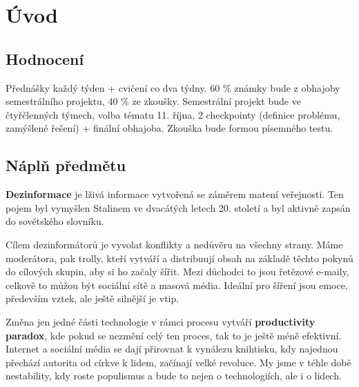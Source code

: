 \section*{Úvod}

\vspace{12pt}

\subsection*{Hodnocení}

Přednášky každý týden + cvičení co dva týdny. 60 \% známky bude z obhajoby semestrálního projektu, 40 \% ze zkoušky. Semestrální projekt bude ve čtyřčlenných týmech, volba tématu 11. října, 2 checkpointy (definice problému, zamýšlené řešení) + finální obhajoba. Zkouška bude formou písemného testu.

\subsection*{Náplň předmětu}

\textbf{Dezinformace} je lživá informace vytvořená se záměrem matení veřejnosti. Ten pojem byl vymyšlen Stalinem ve dvacátých letech 20. století a byl aktivně zapsán do sovětského slovníku.

\begin{quote}
\end{quote}

Cílem dezinformátorů je vyvolat konflikty a nedůvěru na všechny strany. Máme moderátora, pak trolly, kteří vytváří a distribuují obsah na základě těchto pokynů do cílových skupin, aby si ho začaly šířit. Mezi důchodci to jsou řetězové e-maily, celkově to můžou být sociální sítě a masová média. Ideální pro šíření jsou emoce, především vztek, ale ještě silnější je vtip.

\begin{quote}
\end{quote}

Změna jen jedné části technologie v rámci procesu vytváří \textbf{productivity paradox}, kde pokud se nezmění celý ten proces, tak to je ještě méně efektivní. Internet a sociální média se dají přirovnat k vynálezu knihtisku, kdy najednou přechází autorita od církve k lidem, začínají velké revoluce. My jsme v téhle době nestability, kdy roste populismus a bude to nejen o technologiích, ale i o lidech.

